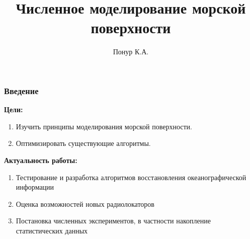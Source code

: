 \documentclass[10pt,pdf,hyperref={unicode}, dvipsnames]{beamer}
\begin{document}
\title[Измерение плотности плазмы]{Численное моделирование морской поверхности}

\author{Понур К.А.}




\begin{frame}[t]
	\frametitle{Введение}
	\vfill
	\textbf{Цели: }\\
		\begin{enumerate}
			\item Изучить принципы моделирования морской поверхности.

			\item Оптимизировать существующие алгоритмы.


		\end{enumerate}
		\vfill

	\textbf{Актуальность работы: }

	\begin{enumerate}
		\item Тестирование и разработка алгоритмов восстановления океанографической информации
		\item Оценка возможностей новых радиолокаторов
		\item Постановка численных экспериментов, в частности накопление статистических данных
	\end{enumerate}
	\vfill
\end{frame}

\end{document}
